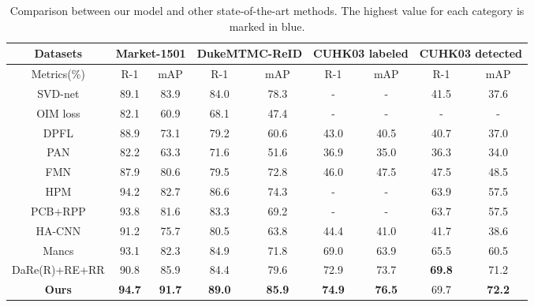 \documentclass[10pt,twocolumn,letterpaper]{article}
\begin{document}
\begin{table*}[]
\begin{center}
\begin{tabular}{c|cc|cc|cc|cc}
\hline
\hline
Datasets & \multicolumn{2}{c|}{Market-1501} & \multicolumn{2}{c|}{DukeMTMC-ReID} & \multicolumn{2}{c|}{CUHK03 labeled} & \multicolumn{2}{c}{CUHK03 detected} \\ \hline
Metrics(\%) & R-1 & \multicolumn{1}{c|}{mAP} & R-1 & mAP & R-1 & mAP & R-1 & mAP \\ \hline
SVD-net \cite{random_erase} & 89.1 & \multicolumn{1}{c|}{83.9} & 84.0 & 78.3 & - & - & 41.5 & 37.6 \\
OIM loss \cite{oimloss} & 82.1 & \multicolumn{1}{c|}{60.9} & 68.1 & 47.4 & - & - & - & - \\
DPFL \cite{dpfl} & 88.9 & \multicolumn{1}{c|}{73.1} & 79.2 & 60.6 & 43.0 & 40.5 & 40.7 & 37.0 \\
PAN \cite{pan} & 82.2 & \multicolumn{1}{c|}{63.3} & 71.6 & 51.6 & 36.9 & 35.0 & 36.3 & 34.0 \\
FMN \cite{fmn} & 87.9 & 80.6 & 79.5 & 72.8 & 46.0 & 47.5 & 47.5 & 48.5 \\ \hline
HPM \cite{hpm} & 94.2 & 82.7 & 86.6 & 74.3 & - & - & 63.9 & 57.5 \\
PCB+RPP \cite{pcb} & 93.8 & \multicolumn{1}{c|}{81.6} & 83.3 & 69.2 & - & - & 63.7 & 57.5 \\
HA-CNN \cite{atten_reid_harm} & 91.2 & \multicolumn{1}{c|}{75.7} & 80.5 & 63.8 & 44.4 & 41.0 & 41.7 & 38.6 \\
Mancs \cite{mancs} & 93.1 & \multicolumn{1}{c|}{82.3} & 84.9 & 71.8 & 69.0 & 63.9 & 65.5 & 60.5 \\
DaRe(R)+RE+RR \cite{deepsuper_reid} & 90.8 & \multicolumn{1}{c|}{85.9} & 84.4 & 79.6 & {\color[HTML]{333333} 72.9} & 73.7 & {\color[HTML]{3166FF} \textbf{69.8}} & 71.2 \\
\hline
\textbf{Ours} & {\color[HTML]{3166FF} \textbf{94.7}} & \multicolumn{1}{c|}{{\color[HTML]{3166FF} \textbf{91.7}}} & {\color[HTML]{3166FF} \textbf{89.0}} & {\color[HTML]{3166FF} \textbf{85.9}} & {\color[HTML]{3166FF} \textbf{74.9}} & {\color[HTML]{3166FF} \textbf{76.5}} & 69.7 & {\color[HTML]{3166FF} \textbf{72.2}} \\ \hline \hline
\end{tabular}
\end{center}
\caption{Comparison between our model and other state-of-the-art methods. The highest value for each category is marked in blue.}
\label{table:main}
\end{table*}
\end{document}
